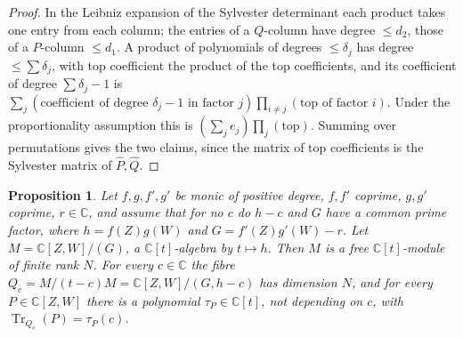 \documentclass[11pt]{amsart}
\newtheorem{proposition}[theorem]{Proposition}
\theoremstyle{remark}\newtheorem{remark}[theorem]{Remark}
\theoremstyle{definition}\newtheorem{example}[theorem]{Example}
\newcommand{\C}{\mathbb{C}}
\newcommand{\Tr}{\operatorname{Tr}}
\begin{document}
\begin{proof}
In the Leibniz expansion of the Sylvester determinant each product takes one entry from each column; the entries of
a $Q$-column have degree $\le d_2$, those of a $P$-column $\le d_1$. A product of polynomials of degrees
$\le\delta_j$ has degree $\le\sum\delta_j$, with top coefficient the product of the top coefficients, and its
coefficient of degree $\sum\delta_j-1$ is $\sum_j(\text{coefficient of degree }\delta_j-1\text{ in factor }j)\prod_{i\ne j}(\text{top of factor }i)$.
Under the proportionality assumption this is $(\sum_je_j)\prod_j(\text{top})$. Summing over permutations gives the two
claims, since the matrix of top coefficients is the Sylvester matrix of $\hat P,\hat Q$.
\end{proof}

\begin{proposition}\label{prop:deform}
Let $f,g,f',g'$ be monic of positive degree, $f,f'$ coprime, $g,g'$ coprime, $r\in\C$, and assume that for no $c$
do $h-c$ and $G$ have a common prime factor, where $h=f(Z)g(W)$ and $G=f'(Z)g'(W)-r$. Let $M=\C[Z,W]/(G)$, a
$\C[t]$-algebra by $t\mapsto h$. Then $M$ is a free $\C[t]$-module of finite rank $N$. For every $c\in\C$ the fibre
$Q_c=M/(t-c)M=\C[Z,W]/(G,h-c)$ has dimension $N$, and for every $P\in\C[Z,W]$ there is a polynomial
$\tau_P\in\C[t]$, not depending on $c$, with $\Tr_{Q_c}(P)=\tau_P(c)$.
\end{proposition}
\end{document}
